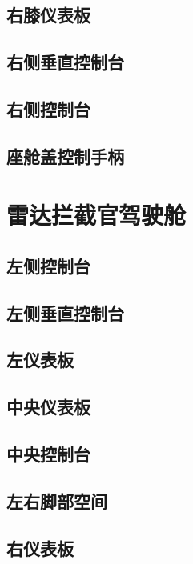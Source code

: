 \subsection{右膝仪表板}

\subsection{右侧垂直控制台}

\subsection{右侧控制台}

\subsection{座舱盖控制手柄}

\section{雷达拦截官驾驶舱}

\subsection{左侧控制台}

\subsection{左侧垂直控制台}

\subsection{左仪表板}

\subsection{中央仪表板}

\subsection{中央控制台}


\subsection{左右脚部空间}

\subsection{右仪表板}

